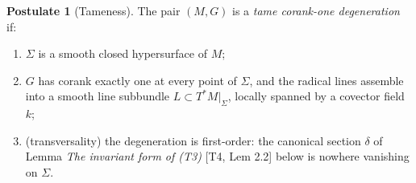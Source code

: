 \documentclass[11pt]{article}
\theoremstyle{definition}
\newtheorem{postulate}[theorem]{Postulate}
\theoremstyle{plain}
\providecommand{\Sig}{}\renewcommand{\Sig}{\Sigma}
\providecommand{\shL}{}\renewcommand{\shL}{L}
\begin{document}
\begin{postulate}[Tameness]\label{c:sheaf.tameness}
The pair $(M, G)$ is a \emph{tame corank-one degeneration} if:
\begin{enumerate}
\item[(T1)] $\Sig$ is a smooth closed hypersurface of $M$;
\item[(T2)] $G$ has corank exactly one at every point of $\Sig$, and the radical lines assemble into a smooth line subbundle $\shL \subset T^*M|_\Sig$, locally spanned by a covector field $k$;
\item[(T3)] (transversality) the degeneration is first-order: the canonical section $\delta$ of Lemma \emph{The invariant form of (T3)} [T4, Lem 2.2] below is nowhere vanishing on $\Sig$.
\end{enumerate}
\end{postulate}
\end{document}
